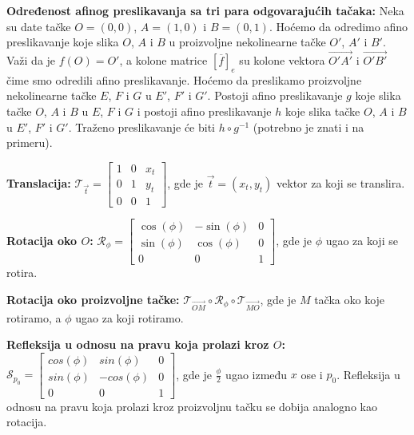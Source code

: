 \documentclass[12pt]{article}
\newcommand{\vek}[1]{\overrightarrow{#1}}
\begin{document}
\textbf{Određenost afinog preslikavanja sa tri para odgovarajućih tačaka:}
Neka su date tačke $O=(0,0)$, $A=(1,0)$ i $B=(0,1)$. Hoćemo da odredimo afino
preslikavanje koje slika $O$, $A$ i $B$ u proizvoljne nekolinearne tačke $O'$,
$A'$ i $B'$. Važi da je $f(O)=O'$, a kolone matrice $[\overline{f}]_{e}$ su
kolone vektora $\vek{O'A'}$ i $\vek{O'B'}$ čime smo odredili afino
preslikavanje. Hoćemo da preslikamo proizvoljne nekolinearne tačke $E$, $F$ i
$G$ u $E'$, $F'$ i $G'$. Postoji afino preslikavanje $g$ koje slika tačke $O$,
$A$ i $B$ u $E$, $F$ i $G$ i postoji afino preslikavanje $h$ koje slika tačke
$O$, $A$ i $B$ u $E'$, $F'$ i $G'$. Traženo preslikavanje će biti
$h\circ g^{-1}$ (potrebno je znati i na primeru).
\par

\textbf{Translacija:}
$\mathcal{T}_{\vek{t}}=\begin{bmatrix}
        1 & 0 & x_t \\
        0 & 1 & y_t \\
        0 & 0 & 1
    \end{bmatrix}$, gde je $\vek{t}=(x_t,y_t)$ vektor za koji se translira.
\par

\textbf{Rotacija oko $O$:}
$\mathcal{R}_\phi=\begin{bmatrix}
        \cos(\phi) & -\sin(\phi) & 0 \\
        \sin(\phi) & \cos(\phi)  & 0 \\
        0          & 0           & 1
    \end{bmatrix}$, gde je $\phi$ ugao za koji se rotira.
\par

\textbf{Rotacija oko proizvoljne tačke:}
$\mathcal{T}_{\vek{OM}}\circ\mathcal{R}_\phi\circ\mathcal{T}_{\vek{MO}}$, gde
je $M$ tačka oko koje rotiramo, a $\phi$ ugao za koji rotiramo.
\par

\textbf{Refleksija u odnosu na pravu koja prolazi kroz $O$:}
$\mathcal{S}_{p_0}=\begin{bmatrix}
        cos(\phi) & sin(\phi)  & 0 \\
        sin(\phi) & -cos(\phi) & 0 \\
        0         & 0          & 1
    \end{bmatrix}$, gde je $\frac{\phi}{2}$ ugao između $x$ ose i $p_0$.
Refleksija u odnosu na pravu koja prolazi kroz proizvoljnu tačku se dobija
analogno kao rotacija.
\par
\end{document}
